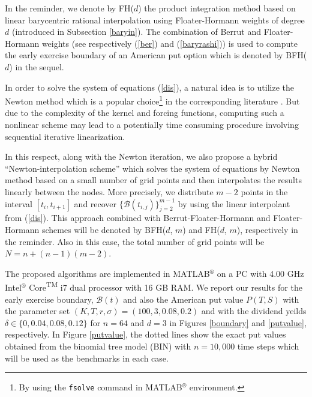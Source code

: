 \documentclass[fleqn,final,3p,11pt]{elsarticle}
\theoremstyle{definition}
\theoremstyle{remark}
\numberwithin{equation}{section}
\begin{document}
In the reminder, we denote by FH($d$) the product integration method based on linear barycentric rational interpolation using Floater-Hormann weights of degree $d$ (introduced in Subsection \ref{baryin}).
The combination of Berrut and Floater-Hormann weights (see respectively  (\ref{ber}) and (\ref{baryrashi})) is used to compute the early exercise boundary of an American put option which is denoted by BFH($d$) in the sequel.

In order to solve the system of equations (\ref{dis}), a natural idea is to utilize the Newton method which is a popular choice\footnote{By using the \texttt{fsolve} command in {MATLAB}$^{\circledR}$ environment.} in the corresponding literature \cite{brunner}. But due to the complexity of the kernel and forcing functions, computing such a nonlinear scheme may lead to a potentially time consuming procedure involving sequential iterative linearization.

In this respect, along with the Newton iteration, we also propose a hybrid ``Newton-interpolation scheme'' which solves the system of equations by Newton method based on a small number of grid points and then interpolates the results linearly between the nodes.
More precisely, we distribute $m-2$ points in the interval $[t_{i}, t_{i+1}]$ and  recover $\{\mathcal{B}(t_{i,j})\}_{j=2}^{m-1}$ by using the linear interpolant from (\ref{dis}). This approach combined with Berrut-Floater-Hormann and Floater-Hormann schemes will be denoted by BFH($d$, $m$) and FH($d$, $m$), respectively in the reminder. Also in this case, the total number of grid points will be  $N= n+(n-1)(m-2)$.

The proposed algorithms are implemented in {MATLAB}$^{\circledR}$ on a PC with 4.00 GHz Intel$^{\circledR}$ Core\textsuperscript{TM} i7 dual processor with 16 GB RAM.
We report our results for the early exercise boundary, $\mathcal{B}(t)$ and also the American put value $P(T,S)$ with the parameter set $( K, T, r, \sigma) = (100, 3,  0.08, 0.2)$ and with the dividend yeilds
$\delta \in \{0, 0.04, 0.08, 0.12\}$
for $n=64$ and $d=3$ in Figures \ref{boundary} and \ref{putvalue}, respectively.  In Figure \ref{putvalue}, the dotted lines show the exact put values obtained from the binomial tree model (BIN) with $n = 10,000$ time steps which will be used as the benchmarks in each case.
\end{document}

